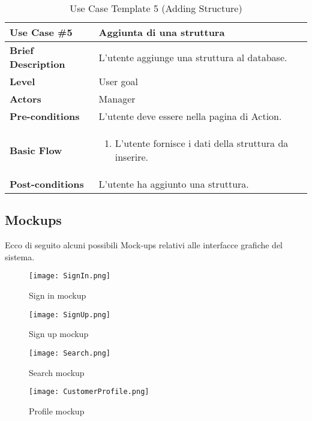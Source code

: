 \documentclass{article}
\begin{document}
\begin{table}[h!]
    \centering
    \begin{tabular}{|l|p{10cm}|}
        \hline
        \textbf{Use Case \#5} & Aggiunta di una struttura \\ \hline
        \textbf{Brief Description} & L’utente aggiunge una struttura al database.\\ \hline
        \textbf{Level} & User goal \\ \hline
        \textbf{Actors} & Manager\\ \hline
        \textbf{Pre-conditions} & L’utente deve essere nella pagina di Action. \\ \hline
        \textbf{Basic Flow} & 
        \begin{enumerate}
            \item L’utente fornisce i dati della struttura da inserire.
        \end{enumerate} \\ \hline
        \textbf{Post-conditions} &L'utente ha aggiunto una struttura.\\ \hline
    \end{tabular}
    \caption{Use Case Template 5 (Adding Structure)}
    \label{tab:use_case_5}
\end{table}
\newpage
\subsection{Mockups}
Ecco di seguito alcuni possibili Mock-ups relativi alle interfacce grafiche del sistema.
\begin{figure}[h!]
    \centering
    \texttt{[image: SignIn.png]}
    \caption{Sign in mockup}
    \label{fig:Sign in mockup}
\end{figure}
\begin{figure}[h!]
    \centering
    \texttt{[image: SignUp.png]}
    \caption{Sign up mockup}
    \label{fig:Sign up mockup}
\end{figure}
\newpage
\begin{figure}[h!]
    \centering
    \texttt{[image: Search.png]}
    \caption{Search mockup}
    \label{fig:Search mockup}
\end{figure}
\vspace{40mm}
\begin{figure}[h!]
    \centering
    \texttt{[image: CustomerProfile.png]}
    \caption{Profile mockup}
    \label{fig:Profile mockup}
\end{figure}
\newpage
\end{document}
